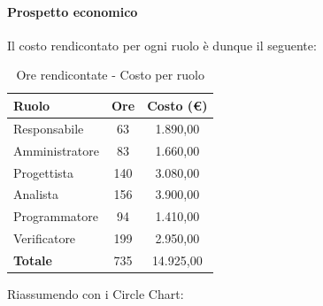 \documentclass[../PianoProgetto.tex]{subfiles}
\begin{document}
\vfill
	
	\paragraph{Prospetto economico}
					Il costo rendicontato per ogni ruolo è dunque il seguente:
	\begin{table}[h]
		\centering
		\begin{tabular}{l * {2}{c}}
			\toprule
			\textbf{Ruolo} & \textbf{Ore} & \textbf{Costo (\euro{})} \\
			\midrule
			Responsabile &	63 & 1.890,00 \\
			Amministratore & 83 & 1.660,00 \\
			Progettista & 140 & 3.080,00 \\
			Analista & 156 & 3.900,00 \\
			Programmatore & 94 & 1.410,00 \\
			Verificatore & 199 & 2.950,00 \\
			\midrule		
			\textbf{Totale} & 735 & 14.925,00 \\
			\bottomrule
		\end{tabular}
		\caption{Ore rendicontate - Costo per ruolo}
		\label{tab:rendicontate_costo}
	\end{table}
\vfill
\newpage
\vfill	
	Riassumendo con i Circle Chart:
\end{document}
